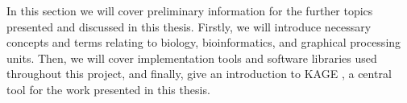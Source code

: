 In this section we will cover preliminary information for the further topics presented and discussed in this thesis.
Firstly, we will introduce necessary concepts and terms relating to biology, bioinformatics, and graphical processing units.
Then, we will cover implementation tools and software libraries used throughout this project,
 and finally, give an introduction to KAGE \cite{kage}, a central tool for the work presented in this thesis.

